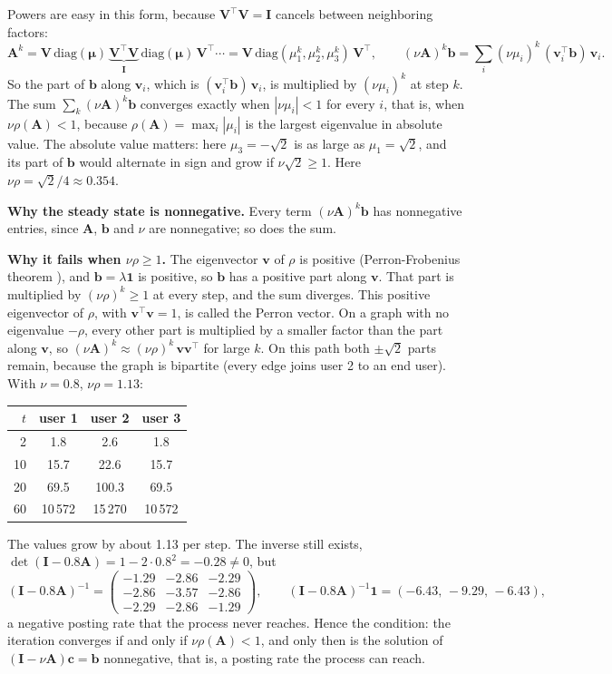 \documentclass[11pt]{article}
\newcommand{\one}{\mathbf{1}}
\newcommand{\vc}{\boldsymbol{c}}
\newcommand{\vb}{\boldsymbol{b}}
\newcommand{\vv}{\boldsymbol{v}}
\newcommand{\vmu}{\boldsymbol{\mu}}
\newcommand{\mA}{\mathbf{A}}
\newcommand{\mI}{\mathbf{I}}
\newcommand{\mV}{\mathbf{V}}
\begin{document}
Powers are easy in this form, because $\mV^\top \mV = \mI$ cancels between neighboring factors:
\[
\mA^k = \mV \,\mathrm{diag}(\vmu)\, \underbrace{\mV^\top \mV}_{\mI} \,\mathrm{diag}(\vmu)\, \mV^\top \cdots = \mV \,\mathrm{diag}(\mu_1^k, \mu_2^k, \mu_3^k)\, \mV^\top ,
\qquad
(\nu \mA)^k \vb = \sum_i (\nu\mu_i)^k\, (\vv_i^\top \vb)\, \vv_i .
\]
So the part of $\vb$ along $\vv_i$, which is $(\vv_i^\top \vb)\, \vv_i$, is multiplied by $(\nu\mu_i)^k$ at step $k$.  The sum $\sum_k (\nu \mA)^k \vb$ converges exactly when $|\nu\mu_i| < 1$ for every $i$, that is, when $\nu\rho(\mA) < 1$, because $\rho(\mA) = \max_i |\mu_i|$ is the largest eigenvalue in absolute value.  The absolute value matters: here $\mu_3 = -\sqrt2$ is as large as $\mu_1 = \sqrt2$, and its part of $\vb$ would alternate in sign and grow if $\nu\sqrt2 \ge 1$.  Here $\nu\rho = \sqrt2/4 \approx 0.354$.

\textbf{Why the steady state is nonnegative.}  Every term $(\nu \mA)^k \vb$ has nonnegative entries, since $\mA$, $\vb$ and $\nu$ are nonnegative; so does the sum.

\textbf{Why it fails when $\nu\rho \ge 1$.}  The eigenvector $\vv$ of $\rho$ is positive (Perron-Frobenius theorem \cite[Ch.~8]{horn2013}), and $\vb = \lambda\one$ is positive, so $\vb$ has a positive part along $\vv$.  That part is multiplied by $(\nu\rho)^k \ge 1$ at every step, and the sum diverges.  This positive eigenvector of $\rho$, with $\vv^\top \vv = 1$, is called the Perron vector.  On a graph with no eigenvalue $-\rho$, every other part is multiplied by a smaller factor than the part along $\vv$, so $(\nu \mA)^k \approx (\nu\rho)^k\, \vv\vv^\top$ for large $k$.  On this path both $\pm\sqrt2$ parts remain, because the graph is bipartite (every edge joins user 2 to an end user).  With $\nu = 0.8$, $\nu\rho = 1.13$:

\begin{center}
\begin{tabular}{rccc}
\toprule
$t$ & user 1 & user 2 & user 3 \\
\midrule
2 & 1.8 & 2.6 & 1.8 \\
10 & 15.7 & 22.6 & 15.7 \\
20 & 69.5 & 100.3 & 69.5 \\
60 & 10\,572 & 15\,270 & 10\,572 \\
\bottomrule
\end{tabular}
\end{center}

The values grow by about 1.13 per step.  The inverse still exists, $\det(\mI - 0.8\mA) = 1 - 2\cdot 0.8^2 = -0.28 \ne 0$, but
\[
(\mI - 0.8\mA)^{-1} = \begin{pmatrix} -1.29 & -2.86 & -2.29 \\ -2.86 & -3.57 & -2.86 \\ -2.29 & -2.86 & -1.29 \end{pmatrix},
\qquad
(\mI - 0.8\mA)^{-1}\one = (-6.43,\, -9.29,\, -6.43),
\]
a negative posting rate that the process never reaches.  Hence the condition: the iteration converges if and only if $\nu\rho(\mA) < 1$, and only then is the solution of $(\mI - \nu\mA)\vc = \vb$ nonnegative, that is, a posting rate the process can reach.
\end{document}
